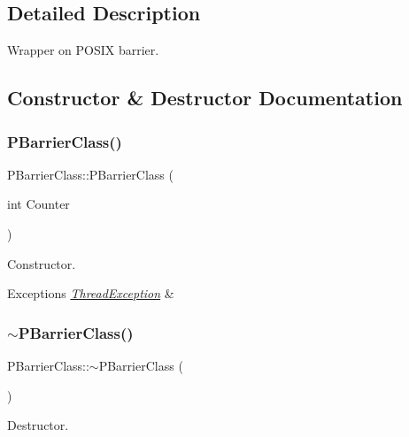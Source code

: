 \subsection{Detailed Description}
Wrapper on P\+O\+S\+IX barrier. 

\subsection{Constructor \& Destructor Documentation}
\mbox{\label{classPBarrierClass_ac10aa9da8e6abd94c8ea2f3ec16b0465}} 
\subsubsection{\texorpdfstring{P\+Barrier\+Class()}{PBarrierClass()}}
{\footnotesize\ttfamily P\+Barrier\+Class\+::\+P\+Barrier\+Class (\begin{DoxyParamCaption}\item[{int}]{Counter }\end{DoxyParamCaption})\hspace{0.3cm}{\ttfamily [noexcept]}}

Constructor. 
\begin{DoxyExceptions}{Exceptions}
{\em \hyperlink{classThreadException}{Thread\+Exception}} & \\
\hline
\end{DoxyExceptions}
\mbox{\label{classPBarrierClass_ae2b26bf61dbb556584701967d1769658}} 
\subsubsection{\texorpdfstring{$\sim$\+P\+Barrier\+Class()}{~PBarrierClass()}}
{\footnotesize\ttfamily P\+Barrier\+Class\+::$\sim$\+P\+Barrier\+Class (\begin{DoxyParamCaption}{ }\end{DoxyParamCaption})\hspace{0.3cm}{\ttfamily [virtual]}}



Destructor. 



